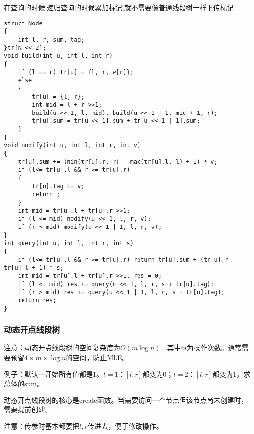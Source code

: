 \documentclass[a4paper, fontset=none]{ctexart}
\begin{document}
在查询的时候,递归查询的时候累加标记,就不需要像普通线段树一样下传标记
\begin{verbatim}
struct Node
{
    int l, r, sum, tag;
}tr[N << 2];
void build(int u, int l, int r)
{
    if (l == r) tr[u] = {l, r, w[r]};
    else
    {
        tr[u] = {l, r};
        int mid = l + r >>1;
        build(u << 1, l, mid), build(u << 1 | 1, mid + 1, r);
        tr[u].sum = tr[u << 1].sum + tr[u << 1 | 1].sum;
    }
}
void modify(int u, int l, int r, int v)
{
    tr[u].sum += (min(tr[u].r, r) - max(tr[u].l, l) + 1) * v;
    if (l<= tr[u].l && r >= tr[u].r)
    {
        tr[u].tag += v;
        return ;
    }
    int mid = tr[u].l + tr[u].r >>1;
    if (l <= mid) modify(u << 1, l, r, v);
    if (r > mid) modify(u << 1 | 1, l, r, v);
}
int query(int u, int l, int r, int s)
{
    if (l<= tr[u].l && r >= tr[u].r) return tr[u].sum + (tr[u].r - tr[u].l + 1) * s;
    int mid = tr[u].l + tr[u].r >>1, res = 0;
    if (l <= mid) res += query(u << 1, l, r, s + tr[u].tag);
    if (r > mid) res += query(u << 1 | 1, l, r, s + tr[u].tag);
    return res;
}
\end{verbatim}
\subsubsection{动态开点线段树}
注意：动态开点线段树的空间复杂度为$O(m\log n)$，其中$m$为操作次数。通常需要预留$4 \times m \times \log n$的空间，防止MLE。

例子：默认一开始所有值都是$1$。$t=1$：$[l, r]$都变为$0$；$t=2$：$[l, r]$都变为$1$，求总体的$\text{sum}$。

动态开点线段树的核心是create函数。当需要访问一个节点但该节点尚未创建时，需要提前创建。

注意：传参时基本都要把$l, r$传进去，便于修改操作。
\end{document}
